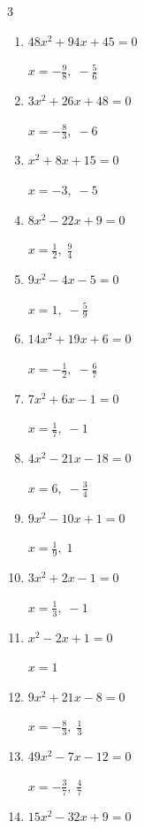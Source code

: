 \begin{multicols}{3}
\begin{enumerate}
  \item $48x^{2}+94x+45=0$

        $\displaystyle x=-\frac{9}{8},\; -\frac{5}{6}$

  \item $3x^{2}+26x+48=0$

        $\displaystyle x=-\frac{8}{3},\; -6$

  \item $x^{2}+8x+15=0$

        $\displaystyle x=-3,\; -5$

  \item $8x^{2}-22x+9=0$

        $\displaystyle x=\frac{1}{2},\; \frac{9}{4}$

  \item $9x^{2}-4x-5=0$

        $\displaystyle x=1,\; -\frac{5}{9}$

  \item $14x^{2}+19x+6=0$

        $\displaystyle x=-\frac{1}{2},\; -\frac{6}{7}$

  \item $7x^{2}+6x-1=0$

        $\displaystyle x=\frac{1}{7},\; -1$

  \item $4x^{2}-21x-18=0$

        $\displaystyle x=6,\; -\frac{3}{4}$

  \item $9x^{2}-10x+1=0$

        $\displaystyle x=\frac{1}{9},\; 1$

\columnbreak %

  \item $3x^{2}+2x-1=0$

        $\displaystyle x=\frac{1}{3},\; -1$

  \item $x^{2}-2x+1=0$

        $\displaystyle x=1$

  \item $9x^{2}+21x-8=0$

        $\displaystyle x=-\frac{8}{3},\; \frac{1}{3}$

  \item $49x^{2}-7x-12=0$

        $\displaystyle x=-\frac{3}{7},\; \frac{4}{7}$

  \item $15x^{2}-32x+9=0$


\end{enumerate}
\end{multicols}
